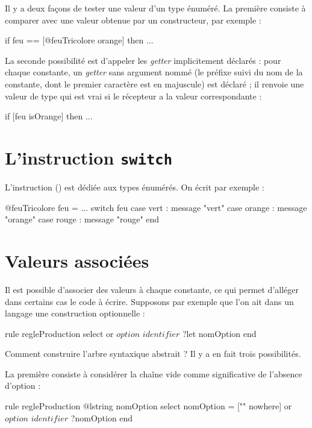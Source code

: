 
Il y a deux façons de tester une valeur d'un type énuméré. La première consiste à comparer avec une valeur obtenue par un constructeur, par exemple :
\begin{galgascode}
  if feu == [@feuTricolore orange] then ...
\end{galgascode}

La seconde possibilité est d'appeler les \emph{getter} implicitement déclarés : pour chaque constante, un \emph{getter} sans argument nommé   (le préfixe  suivi du nom de la constante, dont le premier caractère est en majuscule) est déclaré ; il renvoie une valeur de type  qui est vrai si le récepteur a la valeur correspondante :
\begin{galgascode}
  if [feu isOrange] then ...
\end{galgascode}

\section{L'instruction \texttt{switch}}

L'instruction  () est dédiée aux types énumérés. On écrit par exemple :

\begin{galgascode}
@feuTricolore feu = ...
switch feu
case vert : message "vert"
case orange : message "orange"
case rouge : message "rouge" 
end
\end{galgascode}


\section{Valeurs associées}

Il est possible d'associer des valeurs à chaque constante, ce qui permet d'alléger dans certains cas le code à écrire. Supposons par exemple que l'on ait dans un langage une construction optionnelle :

\begin{galgascode}
rule regleProduction {
  select
  or
    $option$
    $identifier$ ?let nomOption
  end
}
\end{galgascode}

Comment construire l'arbre syntaxique abstrait ? Il y a en fait trois possibilités.

La première consiste à considérer la chaîne vide comme significative de l'absence d'option :
\begin{galgascode}
rule regleProduction {
  @lstring nomOption
  select
    nomOption = ["" nowhere]
  or
    $option$
    $identifier$ ?nomOption
  end
}
\end{galgascode}

